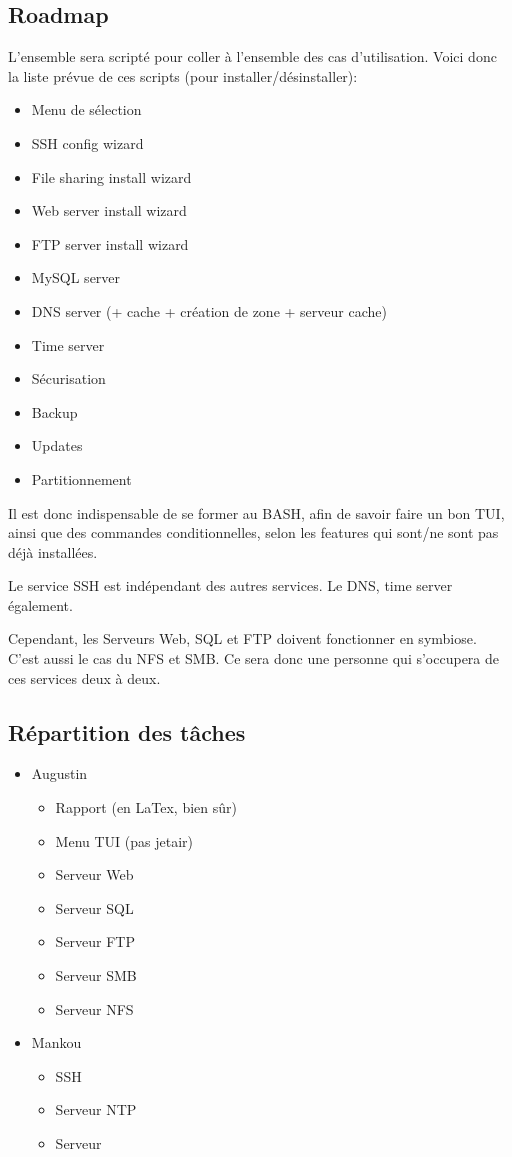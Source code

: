 \documentclass{article}
\begin{document}
	\newpage	
	
	\subsection{Roadmap}
	L'ensemble sera scripté pour coller à l'ensemble des cas d'utilisation. Voici donc la liste prévue de ces scripts (pour installer/désinstaller):
		\begin{itemize}
			\item Menu de sélection
			\item SSH config wizard
			\item File sharing install wizard
			\item Web server install wizard
			\item FTP server install wizard
			\item MySQL server 
			\item DNS server (+ cache + création de zone + serveur cache)
			\item Time server
			\item Sécurisation
			\item Backup
			\item Updates
			\item Partitionnement
		\end{itemize}
		Il est donc indispensable de se former au BASH, afin de savoir faire un bon TUI, ainsi que des commandes conditionnelles, selon les features qui sont/ne sont pas déjà installées.
		
		Le service SSH est indépendant des autres services. Le DNS, time server également.
		
		Cependant, les Serveurs Web, SQL et FTP doivent fonctionner en symbiose. C'est aussi le cas du NFS et SMB. Ce sera donc une personne qui s'occupera de ces services deux à deux.
	\subsection{Répartition des tâches}
	\begin{itemize}
		\item Augustin
		\begin{itemize}
			\item Rapport (en LaTex, bien sûr)
			\item Menu TUI (pas jetair)
			\item Serveur Web
			\item Serveur SQL
			\item Serveur FTP 
			\item Serveur SMB
			\item Serveur NFS
		\end{itemize}
		\item Mankou
		\begin{itemize}
			\item SSH
			\item Serveur NTP
			\item Serveur 
		\end{itemize}
	\end{itemize}
	
\end{document}

